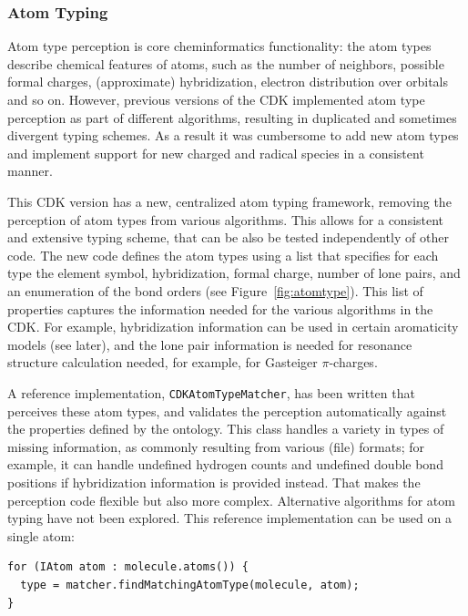 \documentclass[10pt]{bmcart}
\begin{document}
  \subsubsection*{Atom Typing}

  Atom type perception is core cheminformatics functionality: the
  atom types describe chemical features of atoms, such as the number
  of neighbors, possible formal charges, (approximate) hybridization,
  electron distribution over orbitals and so on. However, previous
  versions of the CDK implemented atom type perception as part of
  different algorithms, resulting in duplicated and sometimes
  divergent typing schemes. As a result it was cumbersome to add new
  atom types and implement support for new charged and radical species
  in a consistent manner.
  
  This CDK version has a new, centralized atom typing framework,
  removing the perception of atom types from various algorithms. This
  allows for a consistent and extensive typing scheme, that can be
  also be tested independently of other code.  The new code defines
  the atom types using a list that specifies for each type the element
  symbol, hybridization, formal charge, number of lone pairs, and an
  enumeration of the bond orders (see Figure~\ref{fig:atomtype}). This list of
  properties captures the information needed for the various
  algorithms in the CDK. For example, hybridization information can be
  used in certain aromaticity models (see later), and the lone pair
  information is needed for resonance structure calculation needed,
  for example, for Gasteiger $\pi$-charges.

  A reference implementation, \texttt{CDKAtomTypeMatcher}, has been
  written that perceives these atom types, and validates the
  perception automatically against the properties defined by the
  ontology.  This class handles a variety in types of missing
  information, as commonly resulting from various (file) formats; for
  example, it can handle undefined hydrogen counts and undefined
  double bond positions if hybridization information is provided
  instead.  That makes the perception code flexible but also more
  complex. Alternative algorithms for atom typing have not been
  explored. This reference implementation can be used on a single
  atom:

\vspace{0.2cm}
\begin{verbatim}
for (IAtom atom : molecule.atoms()) {
  type = matcher.findMatchingAtomType(molecule, atom);
}
\end{verbatim}
\vspace{0.2cm}
\end{document}
